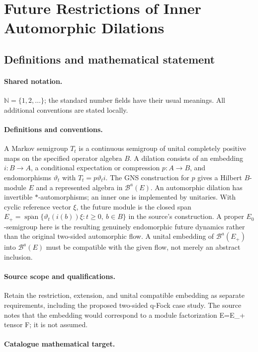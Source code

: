 \documentclass[11pt]{article}
\begin{document}
\section{Future Restrictions of Inner Automorphic Dilations}\label{statement}

\subsection{Definitions and mathematical statement}

\paragraph{Shared notation.}$\mathbb N=\{1,2,\ldots\}$; the standard number fields have their usual meanings. All additional conventions are stated locally.


\paragraph{Definitions and conventions.} A Markov semigroup $T_t$ is a continuous semigroup of unital completely positive maps on the specified operator algebra $B$. A dilation consists of an embedding $i:B\to A$, a conditional expectation or compression $p:A\to B$, and endomorphisms $\vartheta_t$ with $T_t=p\vartheta_t i$. The GNS construction for $p$ gives a Hilbert $B$-module $E$ and a represented algebra in $\mathcal B^a(E)$. An automorphic dilation has invertible $*$-automorphisms; an inner one is implemented by unitaries. With cyclic reference vector $\xi$, the future module is the closed span $E_+=\overline{\operatorname{span}}\{\vartheta_t(i(b))\xi:t\ge0,\ b\in B\}$ in the source's construction. A proper $E_0$-semigroup here is the resulting genuinely endomorphic future dynamics rather than the original two-sided automorphic flow. A unital embedding of $\mathcal B^a(E_+)$ into $\mathcal B^a(E)$ must be compatible with the given flow, not merely an abstract inclusion.

\paragraph{Source scope and qualifications.} Retain the restriction, extension, and unital compatible embedding as separate requirements, including the proposed two-sided q-Fock case study. The source notes that the embedding would correspond to a module factorization E=E\_+ tensor F; it is not assumed.

\paragraph{Catalogue mathematical target.}
\end{document}
